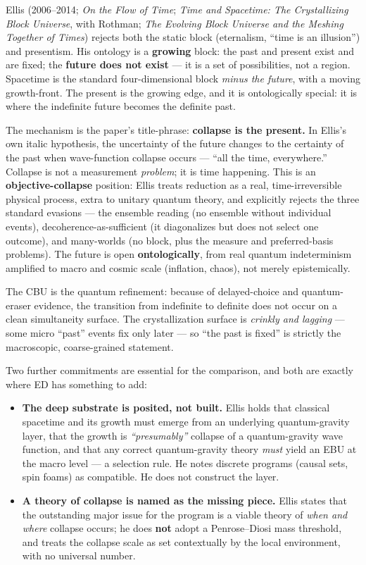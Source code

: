 \documentclass[
  11pt,
]{article}
\providecommand{\tightlist}{%
  \setlength{\itemsep}{0pt}\setlength{\parskip}{0pt}}
\providecommand{\tightlist}{}
\begin{document}
Ellis (2006--2014; \emph{On the Flow of Time}; \emph{Time and Spacetime:
The Crystallizing Block Universe}, with Rothman; \emph{The Evolving
Block Universe and the Meshing Together of Times}) rejects both the
static block (eternalism, ``time is an illusion'') and presentism. His
ontology is a \textbf{growing} block: the past and present exist and are
fixed; the \textbf{future does not exist} --- it is a set of
possibilities, not a region. Spacetime is the standard four-dimensional
block \emph{minus the future}, with a moving growth-front. The present
is the growing edge, and it is ontologically special: it is where the
indefinite future becomes the definite past.

The mechanism is the paper's title-phrase: \textbf{collapse is the
present.} In Ellis's own italic hypothesis, the uncertainty of the
future changes to the certainty of the past when wave-function collapse
occurs --- ``all the time, everywhere.'' Collapse is not a measurement
\emph{problem}; it is time happening. This is an
\textbf{objective-collapse} position: Ellis treats reduction as a real,
time-irreversible physical process, extra to unitary quantum theory, and
explicitly rejects the three standard evasions --- the ensemble reading
(no ensemble without individual events), decoherence-as-sufficient (it
diagonalizes but does not select one outcome), and many-worlds (no
block, plus the measure and preferred-basis problems). The future is
open \textbf{ontologically}, from real quantum indeterminism amplified
to macro and cosmic scale (inflation, chaos), not merely epistemically.

The CBU is the quantum refinement: because of delayed-choice and
quantum-eraser evidence, the transition from indefinite to definite does
not occur on a clean simultaneity surface. The crystallization surface
is \emph{crinkly and lagging} --- some micro ``past'' events fix only
later --- so ``the past is fixed'' is strictly the macroscopic,
coarse-grained statement.

Two further commitments are essential for the comparison, and both are
exactly where ED has something to add:

\begin{itemize}
\tightlist
\item
  \textbf{The deep substrate is posited, not built.} Ellis holds that
  classical spacetime and its growth must emerge from an underlying
  quantum-gravity layer, that the growth is \emph{``presumably''}
  collapse of a quantum-gravity wave function, and that any correct
  quantum-gravity theory \emph{must} yield an EBU at the macro level ---
  a selection rule. He notes discrete programs (causal sets, spin foams)
  as compatible. He does not construct the layer.
\item
  \textbf{A theory of collapse is named as the missing piece.} Ellis
  states that the outstanding major issue for the program is a viable
  theory of \emph{when and where} collapse occurs; he does \textbf{not}
  adopt a Penrose--Diosi mass threshold, and treats the collapse scale
  as set contextually by the local environment, with no universal
  number.
\end{itemize}
\end{document}
